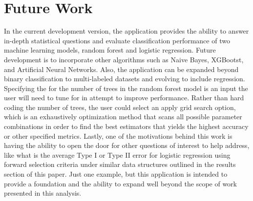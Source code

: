 \documentclass{llncs}
\begin{document}
\section{Future Work}
\noindent 

In the current development version, the application provides the ability to answer in-depth statistical questions and evaluate classification performance of two machine learning models, random forest and logistic regression. Future development is to incorporate other algorithms such as Naive Bayes, XGBootst, and Artificial Neural Networks. Also, the application can be expanded beyond binary classification to multi-labeled datasets and evolving to include regression. Specifying the for the number of trees in the random forest model is an input the user will need to tune for in attempt to improve performance. Rather than hard coding the number of trees, the user could select an apply grid search option, which is an exhaustively optimization method that scans all possible parameter combinations in order to find the best estimators that yields the highest accuracy or other specified metrics. Lastly, one of the motivations behind this work is having the ability to open the door for other questions of interest to help address, like what is the average Type I or Type II error for logistic regression using forward selection criteria under similar data structures outlined in the results section of this paper. Just one example, but this application is intended to provide a foundation and the ability to expand well beyond the scope of work presented in this analysis.
\end{document}
